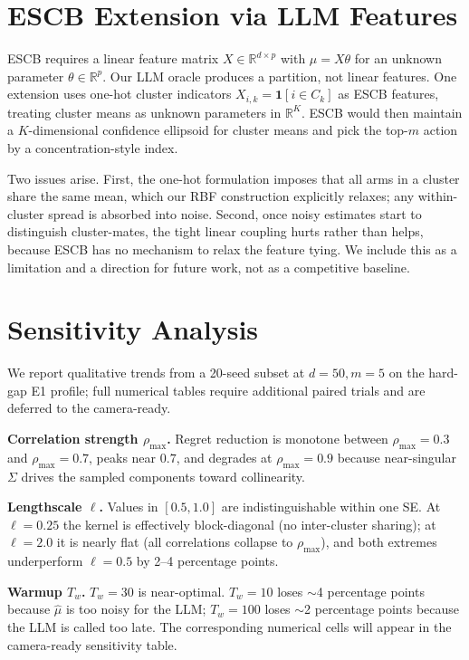\documentclass{article}
\theoremstyle{plain}
\theoremstyle{definition}
\theoremstyle{remark}
\newcommand{\R}{\mathbb{R}}
\begin{document}
\section{ESCB Extension via LLM Features}\label{app:escb}

ESCB \citep{combes2015combinatorial} requires a linear feature matrix $X \in \R^{d \times p}$ with $\mu = X\theta$ for an unknown parameter $\theta \in \R^p$.
Our LLM oracle produces a partition, not linear features.
One extension uses one-hot cluster indicators $X_{i,k} = \mathbf{1}[i \in C_k]$ as ESCB features, treating cluster means as unknown parameters in $\R^K$.
ESCB would then maintain a $K$-dimensional confidence ellipsoid for cluster means and pick the top-$m$ action by a concentration-style index.

Two issues arise.
First, the one-hot formulation imposes that all arms in a cluster share the same mean, which our RBF construction explicitly relaxes; any within-cluster spread is absorbed into noise.
Second, once noisy estimates start to distinguish cluster-mates, the tight linear coupling hurts rather than helps, because ESCB has no mechanism to relax the feature tying.
We include this as a limitation and a direction for future work, not as a competitive baseline.

\section{Sensitivity Analysis}\label{app:sensitivity}

We report qualitative trends from a 20-seed subset at $d=50, m=5$ on the hard-gap E1 profile; full numerical tables require additional paired trials and are deferred to the camera-ready.

\textbf{Correlation strength $\rho_{\max}$.}
Regret reduction is monotone between $\rho_{\max} = 0.3$ and $\rho_{\max} = 0.7$, peaks near $0.7$, and degrades at $\rho_{\max} = 0.9$ because near-singular $\Sigma$ drives the sampled components toward collinearity.

\textbf{Lengthscale $\ell$.}
Values in $[0.5, 1.0]$ are indistinguishable within one SE.
At $\ell = 0.25$ the kernel is effectively block-diagonal (no inter-cluster sharing); at $\ell = 2.0$ it is nearly flat (all correlations collapse to $\rho_{\max}$), and both extremes underperform $\ell = 0.5$ by 2--4 percentage points.

\textbf{Warmup $T_w$.}
$T_w = 30$ is near-optimal.
$T_w = 10$ loses $\sim$4 percentage points because $\hat\mu$ is too noisy for the LLM; $T_w = 100$ loses $\sim$2 percentage points because the LLM is called too late.
The corresponding numerical cells will appear in the camera-ready sensitivity table.
\end{document}
